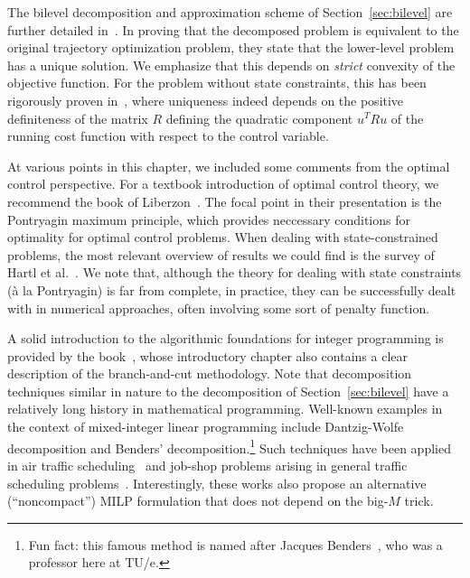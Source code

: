 \documentclass[a4paper]{report}
\theoremstyle{definition}
\theoremstyle{plain}
\begin{document}
The bilevel decomposition and approximation scheme of Section~\ref{sec:bilevel}
are further detailed in~\cite{hultApproximateSolutionOptimal2015,hultTechnicalReportApproximate}.
%
In proving that the decomposed problem is equivalent to the original trajectory
optimization problem, they state that the lower-level problem has a unique
solution. We emphasize that this depends on \emph{strict} convexity of the objective function.
%
For the problem without state constraints, this has been rigorously proven in~\cite[Theorem 5.1, part
(V)]{hanUnifiedNumericalScheme2012}, where uniqueness indeed depends on the positive
definiteness of the matrix $R$ defining the quadratic component $u^T R u$ of the
running cost function with respect to the control variable.

At various points in this chapter, we included some comments from the optimal
control perspective. For a textbook introduction of optimal control theory, we
recommend the book of Liberzon~\cite{liberzonCalculusVariationsOptimal}. The focal point in their presentation is the
Pontryagin maximum principle, which provides neccessary conditions for
optimality for optimal control problems.
%
When dealing with state-constrained problems, the most relevant overview of
results we could find is the survey of Hartl et al.~\cite{hartlSurveyMaximumPrinciples1995}.
%
We note that, although the theory for dealing with state constraints (\`a la
Pontryagin) is far from complete, in practice, they can be successfully dealt
with in numerical approaches, often involving some sort of penalty function.

A solid introduction to the algorithmic foundations for integer programming is
provided by the book~\cite{confortiIntegerProgramming2014}, whose introductory
chapter also contains a clear description of the branch-and-cut methodology.
%
Note that decomposition techniques similar in nature to the decomposition of
Section~\ref{sec:bilevel} have a relatively long history in mathematical programming.
Well-known examples in the context of mixed-integer linear programming include
Dantzig-Wolfe decomposition and Benders' decomposition.\footnote{Fun fact: this
  famous method is named after Jacques
  Benders~\cite{aardalJacquesBendersHis2025}, who was a professor here at TU/e.}
%
Such techniques have been applied in air traffic
scheduling~\cite{manninoPathCycleFormulation2018} and job-shop problems arising
in general traffic scheduling
problems~\cite{lamorgeseNoncompactFormulationJobShop2019}.
%
Interestingly, these works also propose an alternative (``noncompact'') MILP
formulation that does not depend on the big-$M$ trick.
\end{document}

